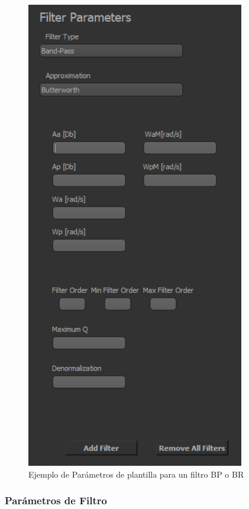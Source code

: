 \begin{figure}[H]
    \centering
    \includegraphics[width=0.85\textwidth]{../Ejercicio1-FilterTool/Imagenes/opciones.png}
    \caption{Ejemplo de Parámetros de plantilla para un filtro BP o BR}
\end{figure}

\subsubsection{Parámetros de Filtro}

